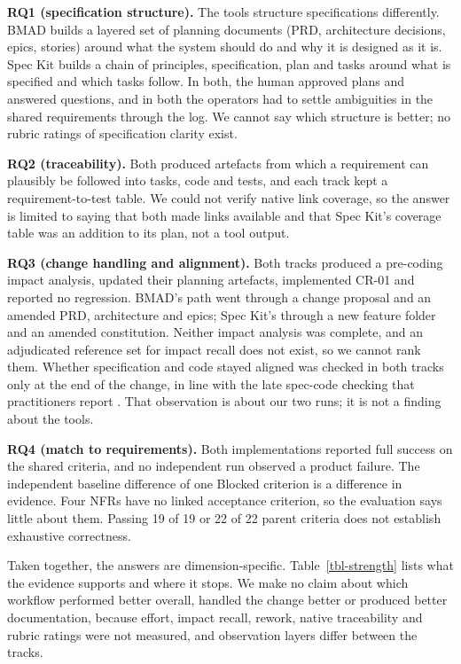 \documentclass[conference]{IEEEtran}
\begin{document}
\textbf{RQ1 (specification structure).} The tools structure
specifications differently. BMAD builds a layered set of planning
documents (PRD, architecture decisions, epics, stories) around what the
system should do and why it is designed as it is. Spec Kit builds a
chain of principles, specification, plan and tasks around what is
specified and which tasks follow. In both, the human approved plans and
answered questions, and in both the operators had to settle ambiguities
in the shared requirements through the log. We cannot say which
structure is better; no rubric ratings of specification clarity exist.

\textbf{RQ2 (traceability).} Both produced artefacts from which a
requirement can plausibly be followed into tasks, code and tests, and
each track kept a requirement-to-test table. We could not verify native
link coverage, so the answer is limited to saying that both made links
available and that Spec Kit's coverage table was an addition to its
plan, not a tool output.

\textbf{RQ3 (change handling and alignment).} Both tracks produced a
pre-coding impact analysis, updated their planning artefacts,
implemented CR-01 and reported no regression. BMAD's path went through a
change proposal and an amended PRD, architecture and epics; Spec Kit's
through a new feature folder and an amended constitution. Neither impact
analysis was complete, and an adjudicated reference set for impact
recall does not exist, so we cannot rank them. Whether specification and
code stayed aligned was checked in both tracks only at the end of the
change, in line with the late spec-code checking that practitioners
report \cite{agarwal2026}. That observation is about our two runs; it
is not a finding about the tools.

\textbf{RQ4 (match to requirements).} Both implementations reported full
success on the shared criteria, and no independent run observed a
product failure. The independent baseline difference of one Blocked
criterion is a difference in evidence. Four NFRs have no linked
acceptance criterion, so the evaluation says little about them. Passing
19 of 19 or 22 of 22 parent criteria does not establish exhaustive
correctness.

Taken together, the answers are dimension-specific.
Table~\ref{tbl-strength} lists what the evidence supports and
where it stops. We make no claim about which workflow performed better
overall, handled the change better or produced better documentation,
because effort, impact recall, rework, native traceability and rubric
ratings were not measured, and observation layers differ between the
tracks.
\end{document}
